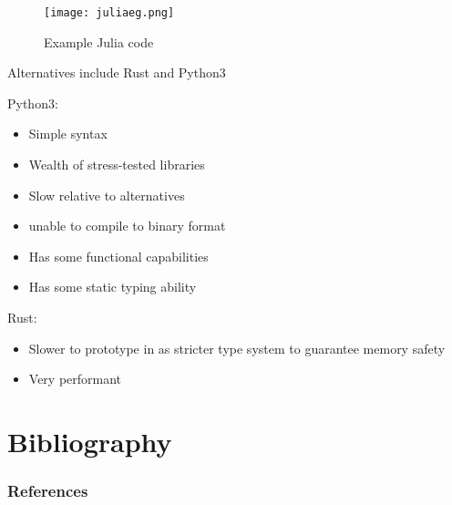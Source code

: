 \documentclass{beamer}
\begin{document}
\begin{frame}
    \begin{figure}[Example Julia code]
        \centering
        \texttt{[image: juliaeg.png]}
        \caption{Example Julia code}%
        \label{fig:name}
    \end{figure}
\end{frame}

\begin{frame}
Alternatives include Rust and Python3

Python3:
\begin{itemize}
    \item Simple syntax
    \item Wealth of stress-tested libraries
        \item Slow relative to alternatives
            \item unable to compile to binary format
                \item Has some functional capabilities
                    \item Has some static typing ability
\end{itemize}
Rust:
\begin{itemize}
    \item Slower to prototype in as stricter type system to guarantee memory safety
        \item Very performant
\end{itemize}
\end{frame}

\section{Bibliography}
\begin{frame}
\frametitle{References}


\end{frame}
\end{document}
